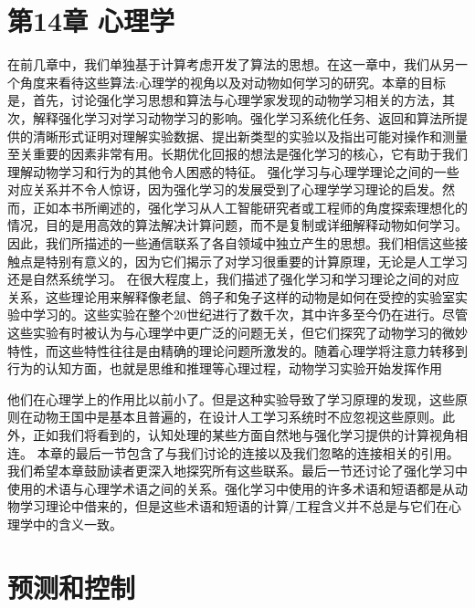 \section{第14章 心理学}
\begin{summary}
	
	在前几章中，我们单独基于计算考虑开发了算法的思想。在这一章中，我们从另一个角度来看待这些算法:心理学的视角以及对动物如何学习的研究。本章的目标是，首先，讨论强化学习思想和算法与心理学家发现的动物学习相关的方法，其次，解释强化学习对学习动物学习的影响。强化学习系统化任务、返回和算法所提供的清晰形式证明对理解实验数据、提出新类型的实验以及指出可能对操作和测量至关重要的因素非常有用。长期优化回报的想法是强化学习的核心，它有助于我们理解动物学习和行为的其他令人困惑的特征。
	强化学习与心理学理论之间的一些对应关系并不令人惊讶，因为强化学习的发展受到了心理学学习理论的启发。然而，正如本书所阐述的，强化学习从人工智能研究者或工程师的角度探索理想化的情况，目的是用高效的算法解决计算问题，而不是复制或详细解释动物如何学习。因此，我们所描述的一些通信联系了各自领域中独立产生的思想。我们相信这些接触点是特别有意义的，因为它们揭示了对学习很重要的计算原理，无论是人工学习还是自然系统学习。
	在很大程度上，我们描述了强化学习和学习理论之间的对应关系，这些理论用来解释像老鼠、鸽子和兔子这样的动物是如何在受控的实验室实验中学习的。这些实验在整个20世纪进行了数千次，其中许多至今仍在进行。尽管这些实验有时被认为与心理学中更广泛的问题无关，但它们探究了动物学习的微妙特性，而这些特性往往是由精确的理论问题所激发的。随着心理学将注意力转移到行为的认知方面，也就是思维和推理等心理过程，动物学习实验开始发挥作用
	
	他们在心理学上的作用比以前小了。但是这种实验导致了学习原理的发现，这些原则在动物王国中是基本且普遍的，在设计人工学习系统时不应忽视这些原则。此外，正如我们将看到的，认知处理的某些方面自然地与强化学习提供的计算视角相连。
	本章的最后一节包含了与我们讨论的连接以及我们忽略的连接相关的引用。我们希望本章鼓励读者更深入地探究所有这些联系。最后一节还讨论了强化学习中使用的术语与心理学术语之间的关系。强化学习中使用的许多术语和短语都是从动物学习理论中借来的，但是这些术语和短语的计算/工程含义并不总是与它们在心理学中的含义一致。
	
\end{summary}

\section{预测和控制}

